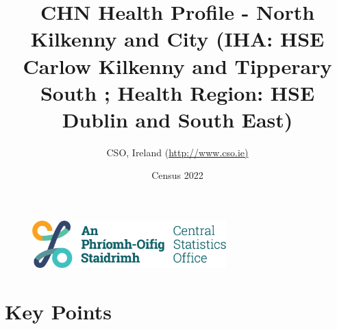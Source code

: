 \documentclass{article}
\title{CHN Health Profile - North Kilkenny and City (IHA: HSE Carlow Kilkenny and Tipperary South ;  Health Region: HSE Dublin and South East) }
\date{Census 2022}
\author{CSO, Ireland  (\url{http://www.cso.ie)}}
\begin{document}


\begin{figure}
	\centering
\includegraphics[width =75mm]{../figures/CSO_Logo.png}
\end{figure}

				 
		   
						  
														  
																																													
												 
			 
\maketitle
					
													   
				 
						 
																																																																											   
				 
				  
  \pagebreak
    	    \tableofcontents

\pagebreak


\section{Key Points}
\end{document}
